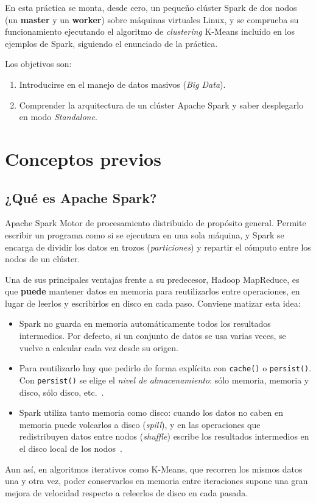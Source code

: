 \documentclass[11pt,a4paper]{article}
\begin{document}
En esta práctica se monta, desde cero, un pequeño clúster Spark de dos nodos (un \textbf{master} y un \textbf{worker}) sobre máquinas virtuales Linux, y se comprueba su funcionamiento ejecutando el algoritmo de \emph{clustering} K-Means incluido en los ejemplos de Spark, siguiendo el enunciado de la práctica.

Los objetivos son:
\begin{enumerate}
  \item Introducirse en el manejo de datos masivos (\emph{Big Data}).
  \item Comprender la arquitectura de un clúster Apache Spark y saber desplegarlo en modo \emph{Standalone}.
\end{enumerate}


\section{Conceptos previos}

\subsection{¿Qué es Apache Spark?}

\begin{concepto}{Apache Spark}
Motor de procesamiento distribuido de propósito general. Permite escribir un programa como si se ejecutara en una sola máquina, y Spark se encarga de dividir los datos en trozos (\emph{particiones}) y repartir el cómputo entre los nodos de un clúster.
\end{concepto}

Una de sus principales ventajas frente a su predecesor, Hadoop MapReduce, es que \textbf{puede} mantener datos en memoria para reutilizarlos entre operaciones, en lugar de leerlos y escribirlos en disco en cada paso. Conviene matizar esta idea:
\begin{itemize}
  \item Spark no guarda en memoria automáticamente todos los resultados intermedios. Por defecto, si un conjunto de datos se usa varias veces, se vuelve a calcular cada vez desde su origen.
  \item Para reutilizarlo hay que pedirlo de forma explícita con \texttt{cache()} o \texttt{persist()}. Con \texttt{persist()} se elige el \emph{nivel de almacenamiento}: sólo memoria, memoria y disco, sólo disco, etc.~\cite{spark-rdd-guide}.
  \item Spark utiliza tanto memoria como disco: cuando los datos no caben en memoria puede volcarlos a disco (\emph{spill}), y en las operaciones que redistribuyen datos entre nodos (\emph{shuffle}) escribe los resultados intermedios en el disco local de los nodos~\cite{spark-rdd-guide}.
\end{itemize}
Aun así, en algoritmos iterativos como K-Means, que recorren los mismos datos una y otra vez, poder conservarlos en memoria entre iteraciones supone una gran mejora de velocidad respecto a releerlos de disco en cada pasada.
\end{document}
